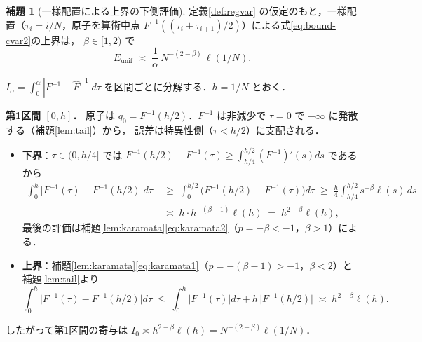 \documentclass[a4paper,10pt]{jsarticle}
\makeatletter
\theoremstyle{definition}
\newtheorem{lemma}{補題}[section]
\renewenvironment{proof}[1][\proofname]{\par
  \pushQED{\qed}%
  \normalfont \topsep6\p@\@plus6\p@\relax
  \trivlist
  \item[\hskip\labelsep\textbf{#1}]\ignorespaces
}{%
  \popQED\endtrivlist\@endpefalse
}
\renewcommand{\proofname}{証明}
\newcommand{\Finv}{F^{-1}}
\newcommand{\Fhinv}{\hat{F}^{-1}}
\makeatother
\begin{document}
\begin{lemma}[一様配置による上界の下側評価]
\label{lem:unif}
定義\ref{def:regvar} の仮定のもと，一様配置（$\tau_i=i/N$，原子を算術中点 $\Finv((\tau_i+\tau_{i+1})/2)$）による式\eqref{eq:bound-cvar2}の上界は，
$\beta\in[1,2)$ で
\begin{equation}
  E_{\mathrm{unif}}\;\asymp\;\frac1\alpha\,N^{-(2-\beta)}\,\ell(1/N).
  \label{eq:eunif}
\end{equation}
\end{lemma}
\begin{proof}
$I_\alpha=\int_0^\alpha|\Finv-\Fhinv|d\tau$ を区間ごとに分解する．$h=1/N$ とおく．

\noindent\textbf{第1区間 $[0,h]$．}
原子は $q_0=\Finv(h/2)$．$\Finv$ は非減少で $\tau=0$ で $-\infty$ に発散する（補題\ref{lem:tail}）から，
誤差は特異性側（$\tau<h/2$）に支配される．
\begin{itemize}
\item \textbf{下界}：$\tau\in(0,h/4]$ では $\Finv(h/2)-\Finv(\tau)\ge\int_{h/4}^{h/2}(\Finv)'(s)ds$ であるから
\begin{align*}
\int_0^{h}\bigl|\Finv(\tau)-\Finv(h/2)\bigr|d\tau
&\;\ge\;\int_0^{h/2}\bigl(\Finv(h/2)-\Finv(\tau)\bigr)d\tau
\;\ge\;\frac{h}{4}\int_{h/4}^{h/2}s^{-\beta}\ell(s)\,ds\\
&\;\asymp\;h\cdot h^{-(\beta-1)}\ell(h)\;=\;h^{2-\beta}\ell(h),
\end{align*}
最後の評価は補題\ref{lem:karamata}\eqref{eq:karamata2}（$p=-\beta<-1$，$\beta>1$）による．
\item \textbf{上界}：補題\ref{lem:karamata}\eqref{eq:karamata1}（$p=-(\beta-1)>-1$，$\beta<2$）と補題\ref{lem:tail}より
\begin{equation*}
\int_0^{h}\bigl|\Finv(\tau)-\Finv(h/2)\bigr|d\tau
\;\le\;\int_0^h\bigl|\Finv(\tau)\bigr|d\tau+h\,\bigl|\Finv(h/2)\bigr|
\;\asymp\;h^{2-\beta}\ell(h).
\end{equation*}
\end{itemize}
したがって第1区間の寄与は $I_0\asymp h^{2-\beta}\ell(h)=N^{-(2-\beta)}\ell(1/N)$．


\end{proof}
\end{document}
